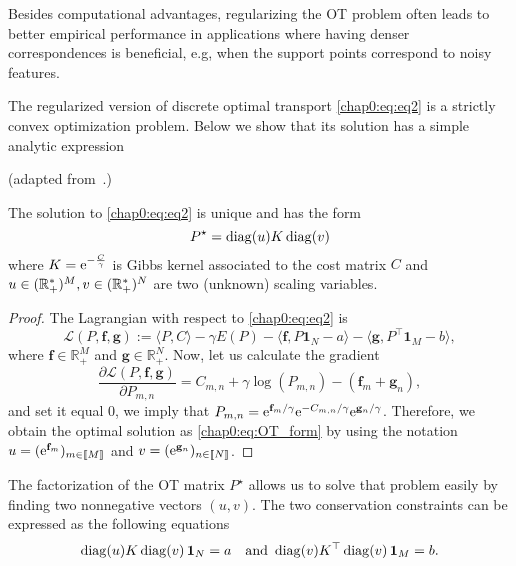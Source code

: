 Besides computational advantages, regularizing the OT problem often leads to better empirical performance in applications where having denser correspondences is beneficial, e.g, when the support points correspond to noisy features.

The regularized version of discrete optimal transport \eqref{chap0:eq:eq2} is a strictly convex optimization problem. Below we show that its solution has a simple analytic expression
\begin{proposition}\label{prop:01}(adapted from~\cite{COT19}.)

The solution to \eqref{chap0:eq:eq2} is unique and has the form 
\begin{equation}
\label{chap0:eq:OT_form}
P^{\star} =\operatorname{diag}(u) K \operatorname{diag}(v) 
\end{equation}
where $K = \mathrm{e}^{-\frac{C}{\gamma}}$ is Gibbs kernel associated to the cost matrix $C$ and $u \in (\mathbb{R}_{+}^{*})^M, v \in (\mathbb{R}_{+}^{*})^{N}$ are two (unknown) scaling variables.
\end{proposition}
\begin{proof}
The Lagrangian with respect to  \eqref{chap0:eq:eq2} is 
\begin{equation*}
\mathcal{L}(P , \mathbf{f}, \mathbf{g}) := \langle P, C \rangle -\gamma E(P) - \langle \mathbf{f}, P \mathbf{1}_N -a \rangle - \langle \mathbf{g}, P^{\top} \mathbf{1}_M - b\rangle,
\end{equation*}
where $\mathbf{f} \in \mathbb{R}^M_{+}$ and $\mathbf{g} \in \mathbb{R}^N_{+}$. Now, let us calculate the gradient
\begin{equation*}
\frac{\partial \mathcal{L}(P, \mathbf{f}, \mathbf{g})}{ \partial P_{m,n}} = C_{m, n} + \gamma \log(P_{m,n})-  (\mathbf{f}_m +\mathbf{g}_n),
\end{equation*}
and set it equal $0$, we imply that $P_{m,n} = \mathrm{e}^{\mathbf{f}_m/\gamma} \mathrm{e}^{-C_{m,n}/\gamma} \mathrm{e}^{\mathbf{g}_n/\gamma}$. Therefore, we obtain the optimal solution as \eqref{chap0:eq:OT_form} by using the notation $u = (\mathrm{e}^{\mathbf{f}_m})_{m \in \llbracket M \rrbracket}$ and $v = (\mathrm{e}^{\mathbf{g}_n})_{n \in \llbracket N \rrbracket}$.
\end{proof}
The factorization of the OT matrix $P^{\star}$ allows us to solve that problem easily by finding two nonnegative vectors $(u,v)$. The two conservation constraints can be expressed as the following equations
\begin{equation*}
  \operatorname{diag}(u) K \operatorname{diag}(v)
  \operatorname{\textbf{1}}_{N}
  =a     \quad \text{and }
  \operatorname{diag}(v)    K^{\top}    \operatorname{diag}(v)
  \operatorname{\textbf{1}}_{M}
  = b.
\end{equation*}
